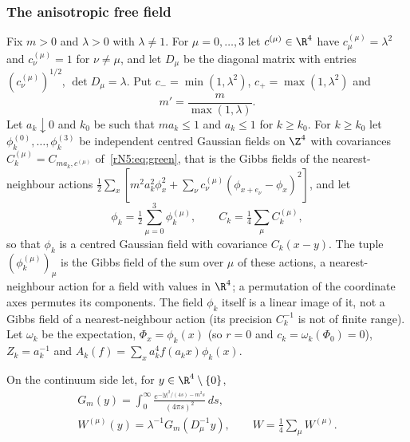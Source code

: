 \subsubsection{The anisotropic free field}

Fix $m>0$ and $\lambda>0$ with $\lambda\ne1$. For $\mu=0,\dots,3$ let
$c^{(\mu)}\in\R^4$ have $c^{(\mu)}_\mu=\lambda^2$ and $c^{(\mu)}_\nu=1$ for
$\nu\ne\mu$, and let $D_\mu$ be the diagonal matrix with entries
$(c^{(\mu)}_\nu)^{1/2}$, $\det D_\mu=\lambda$. Put $c_-=\min(1,\lambda^2)$,
$c_+=\max(1,\lambda^2)$ and
\[
m'=\frac m{\max(1,\lambda)} .
\]
Let $a_k\downarrow0$ and $k_0$ be such that $ma_k\le1$ and $a_k\le1$ for
$k\ge k_0$. For $k\ge k_0$ let $\phi^{(0)}_k,\dots,\phi^{(3)}_k$ be
independent centred Gaussian fields on $\Z^4$ with covariances
$C^{(\mu)}_k=C_{ma_k,c^{(\mu)}}$ of~\eqref{rN5:eq:green}, that is the Gibbs
fields of the nearest-neighbour actions $\frac12\sum_x[m^2a_k^2\phi_x^2+
\sum_\nu c^{(\mu)}_\nu(\phi_{x+e_\nu}-\phi_x)^2]$, and let
\[
\phi_k=\tfrac12\sum_{\mu=0}^3\phi^{(\mu)}_k,\qquad C_k=\tfrac14\sum_\mu
C^{(\mu)}_k ,
\]
so that $\phi_k$ is a centred Gaussian field with covariance $C_k(x-y)$.
The tuple $(\phi^{(\mu)}_k)_\mu$ is the Gibbs field of the sum over $\mu$ of
these actions, a nearest-neighbour action for a field with values in
$\R^4$; a permutation of the coordinate axes permutes its components. The field
$\phi_k$ itself is a linear image of it, not a Gibbs field of a
nearest-neighbour action (its precision $C_k^{-1}$ is not of finite range).
Let $\omega_k$ be the expectation, $\Phi_x=\phi_k(x)$ (so $r=0$ and
$c_k=\omega_k(\Phi_0)=0$), $Z_k=a_k^{-1}$ and $A_k(f)=\sum_xa_k^4f(a_kx)
\phi_k(x)$.

On the continuum side let, for $y\in\R^4\setminus\{0\}$,
\begin{equation}\label{rN5:eq:Gm}
\begin{gathered}
G_m(y)=\int_0^\infty\frac{e^{-|y|^2/(4s)-m^2s}}{(4\pi s)^2}\,ds,\\
W^{(\mu)}(y)=\lambda^{-1}G_m(D_\mu^{-1}y),\qquad W=\tfrac14\sum_\mu W^{(\mu)} .
\end{gathered}
\end{equation}

